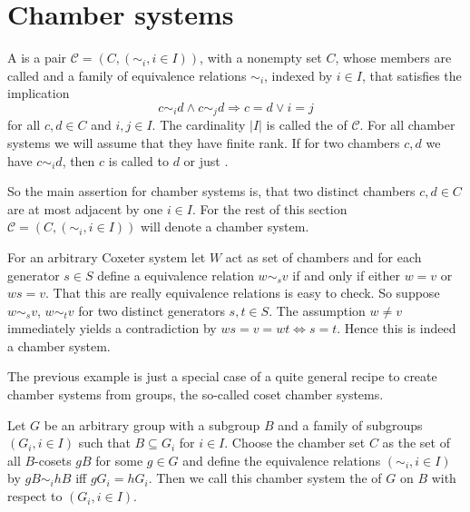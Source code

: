 \section{Chamber systems}

\begin{defi}
	A  is a pair $\mathcal{C} = (C,(\sim_i, i \in I))$, with a nonempty set $C$, whose members are called  and a family of equivalence relations $\sim_i$, indexed by $i \in I$, that satisfies the implication
	$$ c \sim_i d \wedge c \sim_j d \Rightarrow c = d \vee i = j $$
	for all $c,d \in C$ and $i,j \in I$. The cardinality $|I|$ is called the  of $\mathcal{C}$. For all chamber systems we will assume that they have finite rank. If for two chambers $c,d$ we have $c \sim_i d$, then $c$ is called  to $d$ or just .
\end{defi}

So the main assertion for chamber systems is, that two distinct chambers $c,d \in C$ are at most adjacent by one $i \in I$. For the rest of this section $\mathcal{C} = (C,(\sim_i, i \in I))$ will denote a chamber system.

\begin{exam}
	For an arbitrary Coxeter system let $W$ act as set of chambers and for each generator $s \in S$ define a equivalence relation $w \sim_s v$ if and only if either $w = v$ or $ws = v$. That this are really equivalence relations is easy to check. So suppose $w \sim_s v$, $w \sim_t v$ for two distinct generators $s,t \in S$. The assumption $w \neq v$ immediately yields a contradiction by $ws = v = wt \iff s = t$. Hence this is indeed a chamber system.
\end{exam}

The previous example is just a special case of a quite general recipe to create chamber systems from groups, the so-called coset chamber systems.

\begin{defi}
	Let $G$ be an arbitrary group with a subgroup $B$ and a family of subgroups $(G_i, i \in I)$ such that $B \subseteq G_i$ for $i \in I$. Choose the chamber set $C$ as the set of all $B$-cosets $gB$ for some $g \in G$ and define the equivalence relations $(\sim_i, i \in I)$ by $gB \sim_i hB$ iff $gG_i = hG_i$. Then we call this chamber system the  of $G$ on $B$ with respect to $(G_i, i \in I)$.
\end{defi}

